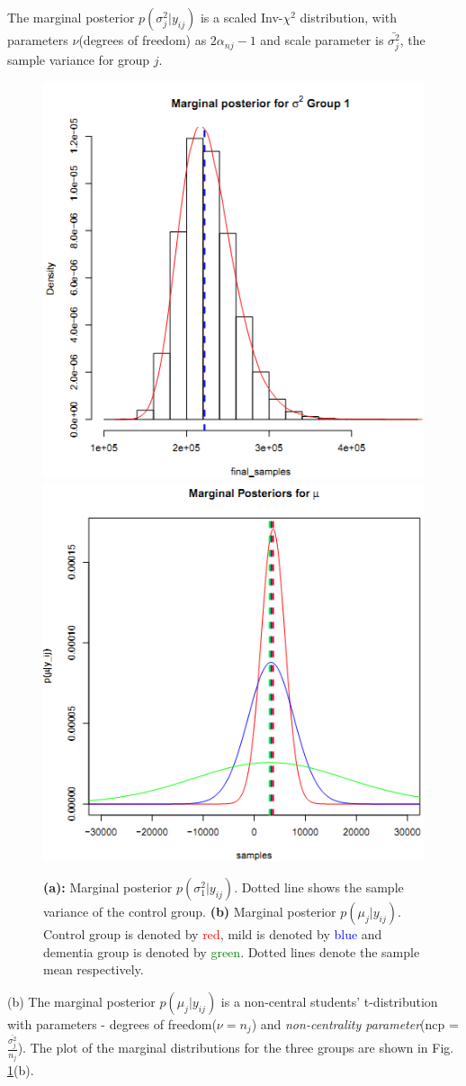 \documentclass[11pt]{article}
\begin{document}
The marginal posterior $p(\sigma^{2}_{j} | y_{ij})$ is a scaled Inv-$\chi^2$ distribution, with parameters $\nu$(degrees of freedom) as $2\alpha_{nj}-1$ and scale parameter is $\bar{\sigma^2_{j}}$, the sample variance for group $j$.

\begin{figure}[!hbt]
 \includegraphics[width=0.5\linewidth] {img5a.png} 
 \includegraphics[width=0.5\linewidth] {img5b.png} 
\caption{\small{ {\bf (a):} Marginal posterior $p(\sigma^{2}_{1} | y_{ij})$. Dotted line shows the sample variance of the control group. {\bf (b)} Marginal posterior $p(\mu_{j} | y_{ij})$. Control group is denoted by \textcolor{red}{red}, mild is denoted by \textcolor{blue}{blue} and dementia group is denoted by \textcolor{green}{green}. Dotted lines denote the sample mean respectively. }}
\label{fig5ab}
\end{figure}
\vspace{-10pt}

\par (b) The marginal posterior $p(\mu_{j} | y_{ij})$ is a non-central students' t-distribution with parameters - degrees of freedom($\nu = n_j$) and \emph{non-centrality parameter}(ncp = $\frac{\bar{\sigma^2_{j}}}{n_j}$). The plot of the marginal distributions for the three groups are shown in Fig. \ref{fig5ab}(b).
\end{document}
